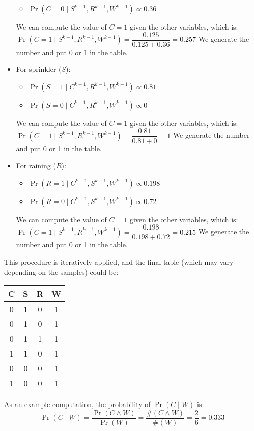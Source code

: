 \begin{example}
\begin{itemize}
\begin{itemize}
                \item $\Pr(C=0\mid S^{k-1},R^{k-1},W^{k-1}) \propto 0.36$
            \end{itemize}
            We can compute the value of $C=1$ given the other variables, which is: 
            $\Pr(C=1\mid S^{k-1},R^{k-1},W^{k-1}) = \dfrac{0.125}{0.125+0.36}=0.257$
            We generate the number and put 0 or 1 in the table.
        \item For sprinkler ($S$):
            \begin{itemize}
                \item $\Pr(S=1\mid C^{k-1},R^{k-1},W^{k-1}) \propto 0.81$
                \item $\Pr(S=0\mid C^{k-1},R^{k-1},W^{k-1}) \propto 0$
            \end{itemize}
            We can compute the value of $C=1$ given the other variables, which is: 
            $\Pr(C=1\mid S^{k-1},R^{k-1},W^{k-1}) = \dfrac{0.81}{0.81+0}=1$
            We generate the number and put 0 or 1 in the table. 
        \item For raining ($R$):
            \begin{itemize}
                \item $\Pr(R=1\mid C^{k-1},S^{k-1},W^{k-1}) \propto 0.198$
                \item $\Pr(R=0\mid C^{k-1},S^{k-1},W^{k-1}) \propto 0.72$
            \end{itemize}
            We can compute the value of $C=1$ given the other variables, which is: 
            $\Pr(C=1\mid S^{k-1},R^{k-1},W^{k-1}) = \dfrac{0.198}{0.198+0.72}=0.215$
            We generate the number and put 0 or 1 in the table. 
    \end{itemize}
    This procedure is iteratively applied, and the final table (which may vary depending on the samples) could be:
    \begin{table}[H]
        \centering
        \begin{tabular}{cccc}
        \hline
        \textbf{C} & \textbf{S} & \textbf{R} & \textbf{W} \\ \hline
        0          & 1          & 0          & 1          \\
        0          & 1          & 0          & 1          \\
        0          & 1          & 1          & 1          \\
        1          & 1          & 0          & 1          \\
        0          & 0          & 0          & 1          \\
        1          & 0          & 0          & 1          \\ \hline
        \end{tabular}
    \end{table}
    As an example computation, the probability of $\Pr(C\mid W)$ is:
    \[\Pr(C\mid W)=\dfrac{\Pr(C \land W)}{\Pr(W)}=\dfrac{\# (C \land W)}{\#(W)}=\dfrac{2}{6}=0.333\]
\end{example}